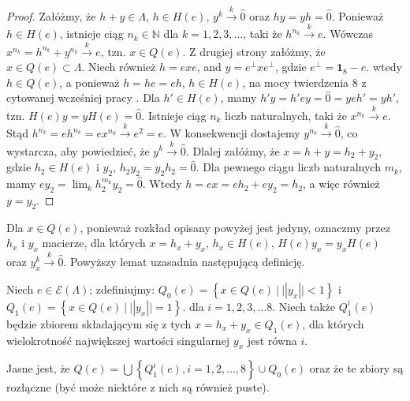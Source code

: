 \begin{proof}
    Załóżmy, że $h + y \in \Lambda$, $h \in H(e)$, $y^{k}  \overset{k}{\rightarrow}  \hat{0}$
    oraz $hy = yh = \hat{0}$.
Ponieważ $h \in H(e)$, istnieje ciąg $n_{k} \in \mathbb{N}$ dla $k =1,2,3,\ldots$,
taki że $h^{n_{k}} \overset{k}{\rightarrow} e$.
Wówczas $x^{n_{k}}  = h^{n_{k}} + y^{n_{k}}  \overset{k}{\rightarrow}  e$, tzn.
    $x \in Q(e)$.
Z drugiej strony
załóżmy, że $x \in Q(e) \subset \Lambda$.
Niech również $h = e x e$, and $y = e^{\perp} x e^{\perp}$,
gdzie $e^{\perp} = \mathbf{1}_{8} - e$.
wtedy $h \in Q(e)$, a ponieważ
    $h =  h e = e h$,
    $h \in H(e)$, na mocy twierdzenia 8 z cytowanej wcześniej pracy
    \cite{schwarz1955hausdorff}.
Dla $h' \in H(e)$, mamy
    $h' y = h' e y = \hat{0} = y e h' = yh'$,
tzn. $H(e) y = y H (e) = \hat{0}$.
Istnieje ciąg $n_{k}$ liczb naturalnych, taki że
    $x^{n_{k}}  \overset{k}{\rightarrow}  e$.
Stąd
    $h^{n_{k}} = e h^{n_{k}}  = e x^{n_{k}}  \overset{k}{\rightarrow} e^{2}  = e$.
W konsekwencji dostajemy $y^{n_{k}}  \overset{k}{\rightarrow}  \hat{0}$,
co wystarcza, aby powiedzieć, że $y^{k} \overset{k}{\rightarrow} \hat{0}$.
Dlalej załóżmy, że $x = h + y = h_{2} + y_{2}$,
    gdzie $h_{2} \in H(e)$ i $y_{2}$,
    $h_{2} y_{2} = y_{2} h_{2} = \hat{0}$.
Dla pewnego ciągu liczb naturalnych $m_{k}$, mamy
    $e y_{2} = \lim_{k} h_{2}^{m_{k}} y_{2} = \hat{0}$.
Wtedy $h = e x = e h_{2} + e y_{2} = h_{2}$, a więc również $y = y_{2}$.
\end{proof}

Dla $x \in Q(e)$, ponieważ rozkład opisany powyżej jest jedyny,
oznaczmy przez $h_{x}$ i $y_{x}$ macierze, dla których
$x = h_{x} + y_{x}$,
$h_{x} \in H(e)$, $H(e) y_{x} = y_{x} H(e)$ oraz
$y_{x}^{k} \overset{k}{\rightarrow} \hat{0}$.
Powyższy lemat uzasadnia następującą definicję.

\begin{Definition}
    Niech $e \in \mathcal{E}(\Lambda)$;
    zdefiniujmy:
    $Q_{0}(e) = \left \{ x \in Q(e) \: | \: || y_{x} || < 1 \right \}$ i
    $Q_{1}(e) = \left \{ x \in Q(e) \: | \: || y_{x} || = 1 \right \}$.
    dla $i = 1, 2, 3, \ldots 8$.
    Niech także $Q_{1}^{i}(e)$ będzie zbiorem składającym się z tych
    $x = h_{x} + y_{x} \in Q_{1}(e)$,
    dla których wielokrotność największej wartości singularnej $y_{x}$
    jest równa $i$.
\end{Definition}

Jasne jest, że
$Q(e) = \bigcup \left \{ Q_{1}^{i}(e), i=1,2,\ldots,8 \right \} \cup Q_{0}(e)$
oraz że te zbiory są rozłączne (być może niektóre z nich są również puste).


